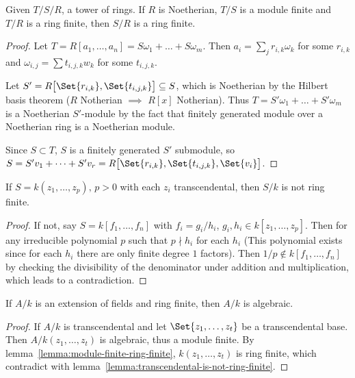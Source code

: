 \begin{lemma} \label{lemma:module-finite-ring-finite}
  Given $T/S/R$, a tower of rings.
  If $R$ is Noetherian, $T/S$ is a module finite and $T/R$ is a ring finite, then $S/R$ is a ring finite.

  \begin{proof}
    Let $T = R[a_1, \dots, a_n] = S \omega_1 + \dots + S \omega_m$.
    Then $a_i = \sum_j r_{i, k} \omega_k$ for some $r_{i, k}$
    and $\omega_{i, j} = \sum t_{i, j, k} w_k$ for some $t_{i, j, k}$.

    Let $S' = R\big[ \Set{r_{i, k}}, \Set{t_{i, j, k}} \big] \subseteq S$, which
    is Noetherian by the Hilbert basis theorem ($R$ Notherian $\implies$ $R[x]$ Notherian).
    Thus $T = S' \omega_1 + \dots + S' \omega_m$ is a Noetherian $S'$-module
    by the fact that finitely generated module over a Noetherian ring is a Noetherian module.

    Since $S \subset T$, $S$ is a finitely generated $S'$ submodule,
    so $S = S' v_1 + \dots + S' v_r = R\big[ \Set{r_{i, k}}, \Set{t_{i, j, k}}, \Set{v_i} \big]$.
  \end{proof}
\end{lemma}

\begin{lemma} \label{lemma:transcendental-is-not-ring-finite}
    If $S = k(z_1, \dots, z_p), \, p > 0$ with each $z_i$ transcendental, then $S/k$ is not ring finite.

  \begin{proof}
    If not, say $S = k[f_1, \dots, f_n]$ with $f_i = g_i / h_i$, $g_i, h_i \in k[z_1, \dots, z_p]$.
    Then for any irreducible polynomial $p$ such that $p \nmid h_i$ for each $h_i$
    (This polynomial exists since for each $h_i$ there are only finite degree $1$ factors).
    Then $1/p \notin k[f_1, \dots, f_n]$ by checking the divisibility of the denominator
    under addition and multiplication, which leads to a contradiction.
  \end{proof}
\end{lemma}

\begin{lemma} \label{lemma:ring-finite-is-alg}
  If $A/k$ is an extension of fields and ring finite, then $A/k$ is algebraic.

  \begin{proof}
    If $A/k$ is transcendental and let $\Set{z_1, \dots, z_t}$ be a transcendental base.
    Then $A/k(z_1, \dots, z_t)$ is algebraic, thus a module finite.
    By lemma~\ref{lemma:module-finite-ring-finite}, $k(z_1, \dots, z_t)$ is ring finite,
    which contradict with lemma~\ref{lemma:transcendental-is-not-ring-finite}.
  \end{proof}
\end{lemma}

